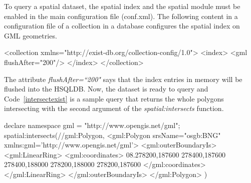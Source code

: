 \documentclass[a4paper,12pt]{article}
\begin{document}
To query a spatial dataset, the spatial index and the spatial module must be enabled in the main configuration file (conf.xml). The following content in a configuration file of a collection in a database configures the spatial index on GML geometries. 
\vspace{10px}
\begin{fakeJSON}
<collection xmlns="http://exist-db.org/collection-config/1.0">
  <index>
    <gml flushAfter="200"/>
  </index>
</collection>
\end{fakeJSON}
\vspace{10px}
The attribute \textit{flushAfter=``200"} says that the index entries in memory will be flushed into the HSQLDB. 
Now, the dataset is ready to query and Code~\ref{intersectexist} is a sample query that returns the whole polygons intersecting with the second argument of the \textit{spatial:intersects} function.
\begin{fakeXML}[label=intersectexist,caption=A spatial sample query in eXist-db using \textit{spatial:intersects} function]
declare namespace gml = "http://www.opengis.net/gml";
spatial:intersects(//gml:Polygon,
  <gml:Polygon srsName="osgb:BNG" xmlns:gml='http://www.opengis.net/gml'>
    <gml:outerBoundaryIs>
      <gml:LinearRing>
        <gml:coordinates>
	  08.278200,187600 278400,187600 278400,188000 278200,188000 278200,187600
	</gml:coordinates>
      </gml:LinearRing>
    </gml:outerBoundaryIs>
  </gml:Polygon>
) 
\end{fakeXML}
\end{document}
